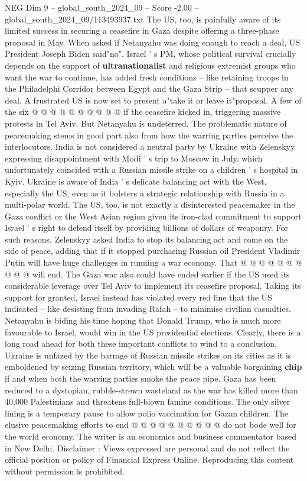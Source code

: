 \begin{textsample}{NEG Dim 9 – global\_south\_2024\_09 – Score -2.00 – global\_south\_2024\_09/113493937.txt}
The US, too, is painfully aware of its limited success in securing a ceasefire in Gaza despite offering a three-phase proposal in May.
When asked if Netanyahu was doing enough to reach a deal, US President Joseph Biden said"no".
Israel ' s PM, whose political survival crucially depends on the support of \textbf{ultranationalist} and religious extremist groups who want the war to continue, has added fresh conditions -- like retaining troops in the Philadelphi Corridor between Egypt and the Gaza Strip -- that scupper any deal.
A frustrated US is now set to present a"take it or leave it"proposal.
A few of the six @ @ @ @ @ @ @ @ @ @ if the ceasefire kicked in, triggering massive protests in Tel Aviv.
But Netanyahu is undeterred.
The problematic nature of peacemaking stems in good part also from how the warring parties perceive the interlocutors.
India is not considered a neutral party by Ukraine with Zelenskyy expressing disappointment with Modi ' s trip to Moscow in July, which unfortunately coincided with a Russian missile strike on a children ' s hospital in Kyiv.
Ukraine is aware of India ' s delicate balancing act with the West, especially the US, even as it bolsters a strategic relationship with Russia in a multi-polar world.
The US, too, is not exactly a disinterested peacemaker in the Gaza conflict or the West Asian region given its iron-clad commitment to support Israel ' s right to defend itself by providing billions of dollars of weaponry.
For such reasons, Zelenskyy asked India to stop its balancing act and come on the side of peace, adding that if it stopped purchasing Russian oil President Vladimir Putin will have huge challenges in running a war economy.
That @ @ @ @ @ @ @ @ @ @ will end.
The Gaza war also could have ended earlier if the US used its considerable leverage over Tel Aviv to implement its ceasefire proposal.
Taking its support for granted, Israel instead has violated every red line that the US indicated -- like desisting from invading Rafah -- to minimise civilian casualties.
Netanyahu is biding his time hoping that Donald Trump, who is much more favourable to Israel, would win in the US presidential elections.
Clearly, there is a long road ahead for both these important conflicts to wind to a conclusion.
Ukraine is unfazed by the barrage of Russian missile strikes on its cities as it is emboldened by seizing Russian territory, which will be a valuable bargaining \textbf{chip} if and when both the warring parties smoke the peace pipe.
Gaza has been reduced to a dystopian, rubble-strewn wasteland as the war has killed more than 40,000 Palestinians and threatens full-blown famine conditions.
The only silver lining is a temporary pause to allow polio vaccination for Gazan children.
The elusive peacemaking efforts to end @ @ @ @ @ @ @ @ @ @ do not bode well for the world economy.
The writer is an economics and business commentator based in New Delhi.
Disclaimer : Views expressed are personal and do not reflect the official position or policy of Financial Express Online.
Reproducing this content without permission is prohibited.

\end{textsample}
